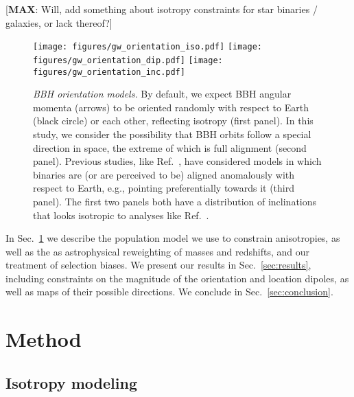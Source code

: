 \documentclass[aps,prd,twocolumn,superscriptaddress,preprintnumbers,floatfix,nofootinbib]{revtex4-2}
\newcommand*{\mi}[1]{{\color{magenta} [{\bf MAX}: #1]}}
\begin{document}
\mi{Will, add something about isotropy constraints for star binaries / galaxies, or lack thereof?}


\begin{figure*}
\texttt{[image: figures/gw\_orientation\_iso.pdf]}
\texttt{[image: figures/gw\_orientation\_dip.pdf]}
\texttt{[image: figures/gw\_orientation\_inc.pdf]}
\caption{\emph{\ac{BBH} orientation models.} By default, we expect \ac{BBH} angular momenta (arrows) to be oriented randomly with respect to Earth (black circle) or each other, reflecting isotropy (first panel).
In this study, we consider the possibility that \ac{BBH} orbits follow a special direction in space, the extreme of which is full alignment (second panel).
Previous studies, like Ref.~\cite{Vitale:2022pmu}, have considered models in which binaries are (or are perceived to be) aligned anomalously with respect to Earth, e.g., pointing preferentially towards it (third panel).
The first two panels both have a distribution of inclinations that looks isotropic to analyses like Ref.~\cite{Vitale:2022pmu}.
}
\label{fig:vectors}
\end{figure*}

In Sec.~\ref{sec:method} we describe the population model we use to constrain anisotropies, as well as the as astrophysical reweighting of masses and redshifts, and our treatment of selection biases.
We present our results in Sec.~\ref{sec:results}, including constraints on the magnitude of the orientation and location dipoles, as well as maps of their possible directions.
We conclude in Sec.~\ref{sec:conclusion}.

\section{Method}
\label{sec:method}

\subsection{Isotropy modeling}

\newcommand*{\dip}[1]{\vec{v}_{#1}}
\newcommand*{\dipraw}[1]{\vec{u}_{#1}}
\end{document}
